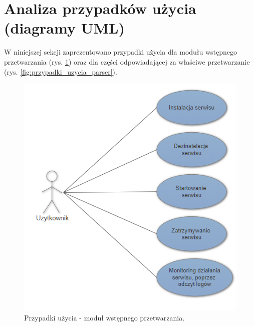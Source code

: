 \documentclass[a4paper]{book}
\begin{document}
\section{Analiza przypadków użycia (diagramy UML)}
W niniejszej sekcji zaprezentowano przypadki użycia dla modułu wstępnego przetwarzania (rys. \ref{fig:przypadki_uzycia_preparser}) oraz dla części odpowiadającej za właściwe przetwarzanie (rys. \ref{fig:przypadki_uzycia_parser}).
\begin{figure}[h]
	\centering
	\includegraphics[width=\textwidth]{./img/przypadki_uzycia_preparser.png}
	\caption{Przypadki użycia - moduł wstępnego przetwarzania.}
	\label{fig:przypadki_uzycia_preparser}
\end{figure}
\end{document}
